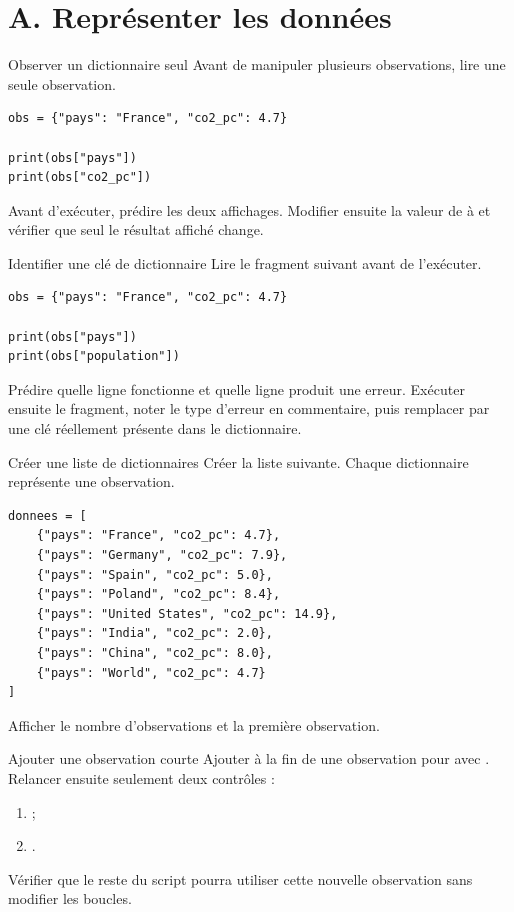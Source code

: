 \documentclass[11pt,a4paper]{article}
\begin{document}
\section*{A. Représenter les données}

\begin{mandatoryexercise}{Observer un dictionnaire seul}
Avant de manipuler plusieurs observations, lire une seule observation.
\begin{lstlisting}
obs = {"pays": "France", "co2_pc": 4.7}

print(obs["pays"])
print(obs["co2_pc"])
\end{lstlisting}
Avant d'exécuter, prédire les deux affichages. Modifier ensuite la valeur de  à  et vérifier que seul le résultat affiché change.
\end{mandatoryexercise}

\begin{mandatoryexercise}{Identifier une clé de dictionnaire}
Lire le fragment suivant avant de l'exécuter.
\begin{lstlisting}
obs = {"pays": "France", "co2_pc": 4.7}

print(obs["pays"])
print(obs["population"])
\end{lstlisting}
Prédire quelle ligne fonctionne et quelle ligne produit une erreur. Exécuter ensuite le fragment, noter le type d'erreur en commentaire, puis remplacer  par une clé réellement présente dans le dictionnaire.
\end{mandatoryexercise}

\begin{mandatoryexercise}{Créer une liste de dictionnaires}
Créer la liste suivante. Chaque dictionnaire représente une observation.
\begin{lstlisting}
donnees = [
    {"pays": "France", "co2_pc": 4.7},
    {"pays": "Germany", "co2_pc": 7.9},
    {"pays": "Spain", "co2_pc": 5.0},
    {"pays": "Poland", "co2_pc": 8.4},
    {"pays": "United States", "co2_pc": 14.9},
    {"pays": "India", "co2_pc": 2.0},
    {"pays": "China", "co2_pc": 8.0},
    {"pays": "World", "co2_pc": 4.7}
]
\end{lstlisting}
Afficher le nombre d'observations et la première observation.
\end{mandatoryexercise}

\begin{mandatoryexercise}{Ajouter une observation courte}
Ajouter à la fin de  une observation pour  avec . Relancer ensuite seulement deux contrôles :
\begin{enumerate}
  \item {} ;
  \item {}.
\end{enumerate}
Vérifier que le reste du script pourra utiliser cette nouvelle observation sans modifier les boucles.
\end{mandatoryexercise}
\end{document}
